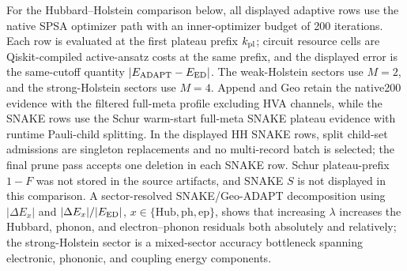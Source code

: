 \documentclass[
  reprint,
  amsmath,
  amssymb,
  aps,
  pra,
  nofootinbib,
  superscriptaddress,
  floatfix
]{revtex4-2}
\begin{document}
For the Hubbard--Holstein comparison below, all displayed adaptive rows use the native SPSA optimizer path with an inner-optimizer budget of 200 iterations. Each row is evaluated at the first plateau prefix \(k_{\rm pl}\); circuit resource cells are Qiskit-compiled active-ansatz costs at the same prefix, and the displayed error is the same-cutoff quantity \(|E_{\rm ADAPT}-E_{\rm ED}|\). The weak-Holstein sectors use \(M=2\), and the strong-Holstein sectors use \(M=4\). Append and Geo retain the native200 evidence with the filtered full-meta profile excluding HVA channels, while the SNAKE rows use the Schur warm-start full-meta SNAKE plateau evidence with runtime Pauli-child splitting. In the displayed HH SNAKE rows, split child-set admissions are singleton replacements and no multi-record batch is selected; the final prune pass accepts one deletion in each SNAKE row. Schur plateau-prefix \(1-F\) was not stored in the source artifacts, and SNAKE \(S\) is not displayed in this comparison.
A sector-resolved SNAKE/Geo-ADAPT decomposition using \(|\Delta E_x|\) and \(|\Delta E_x|/|E_{\rm ED}|\), \(x\in\{\mathrm{Hub},\mathrm{ph},\mathrm{ep}\}\), shows that increasing \(\lambda\) increases the Hubbard, phonon, and electron--phonon residuals both absolutely and relatively; the strong-Holstein sector is a mixed-sector accuracy bottleneck spanning electronic, phononic, and coupling energy components.
\end{document}

